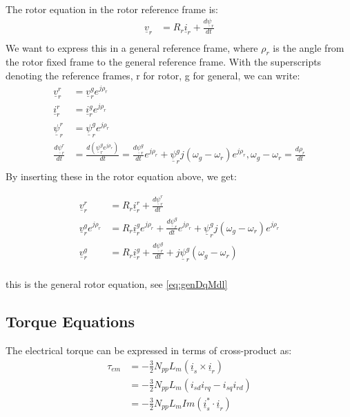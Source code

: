 \documentclass[]{book}
\begin{document}
The rotor equation in the rotor reference frame is:
\[
\begin{aligned}
\underline{v}_r & = R_r \underline{i}_r + \frac{d\underline{\psi}_r}{dt}  \\
\end{aligned}
\label{eq:rotorVoltStat1}
\]
We want to express this in a general reference frame, where \(\rho_r\) is the angle from the rotor fixed frame to the general reference frame. With the superscripts denoting the reference frames, r for rotor, g for general, we can write:
\[
\begin{aligned}
\underline{v}^r_r & = \underline{v}^g_r e^{j\rho_r} \\
\underline{i}^r_r & = \underline{i}^g_r e^{j\rho_r} \\
\underline{\psi}^r_r & = \underline{\psi}^g_r e^{j\rho_r} \\
\frac{d\underline{\psi}^r_r}{dt}  & = \frac{d (\underline{\psi}^g_r e^{j\rho_r} )}{dt}  = 
\frac{d\underline{\psi}^g_r}{dt}  e^{j\rho_r} + \underline{\psi}^g_r j (\omega_g-\omega_r) e^{j\rho_r},
\omega_g-\omega_r = \frac{d\rho_r}{dt} \\
\end{aligned}
\label{eq:rotorVoltStat2}
\]
By inserting these in the rotor equation above, we get:

\[
\begin{aligned}
\underline{v}^r_r & = R_r \underline{i}^r_r + \frac{d\underline{\psi}^r_r}{dt}  \\
\underline{v}^g_r e^{j\rho_r} & = R_r \underline{i}^g_r e^{j\rho_r} + \frac{d\underline{\psi}^g_r}{dt}  e^{j\rho_r} + \underline{\psi}^g_r j (\omega_g-\omega_r) e^{j\rho_r}  \\
\underline{v}^g_r  & = R_r \underline{i}^g_r  + \frac{d\underline{\psi}^g_r}{dt}   + j \underline{\psi}^g_r  (\omega_g-\omega_r)  \\
\end{aligned}
\label{eq:rotorVoltStat3}
\]

this is the general rotor equation, see \eqref{eq:genDqMdl}

\hypertarget{torque-equations}{%
\subsection{Torque Equations}\label{torque-equations}}

The electrical torque can be expressed in terms of cross-product as:
\[
\begin{aligned}
\tau_{em} &= - \frac{3}{2}N_{pp}L_m(\underline{i}_s  \times \underline{i}_r) \\
&= - \frac{3}{2}N_{pp}L_m(i_{sd}i_{rq} -  i_{sq}i_{rd}) \\
&= - \frac{3}{2}N_{pp}L_m Im(\underline{i}^*_s  \cdot \underline{i}_r) \\
\end{aligned}
\label{eq:torque1}
\]
\end{document}
